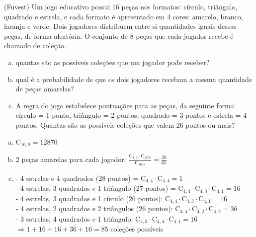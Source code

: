 \begin{ex}
  (Fuvest) Um jogo educativo possui 16 peças nos formatos: círculo, triângulo, quadrado e estrela, e cada formato é apresentado em 4 cores: amarelo, branco, laranja e verde. Dois jogadores distribuem entre si quantidades iguais dessas peças, de forma aleatória. O conjunto de 8 peças que cada jogador recebe é chamado de coleção.
      \begin{enumerate}  [(a)]
          \item quantas são as possíveis coleções que um jogador pode receber? 
          \item qual é a probabilidade de que os dois jogadores recebam a mesma quantidade de peças amarelas? 
          \item A regra do jogo estabelece pontuações para as peças, da seguinte forma: círculo = 1 ponto, triângulo = 2 pontos, quadrado = 3 pontos e estrela = 4 pontos. Quantas são as possíveis coleções que valem 26 pontos ou mais?
      \end{enumerate}
       \begin{sol}
        \phantom{A} 
         \begin{enumerate} [(a)]
             \item $\mathrm{C}_{{16},8}=12870$
             \item 2 peças amarelas para cada jogador: \hspace{0,4cm}
         $\frac{\mathrm{C}_{4,2}\cdot\mathrm{C}_{{12},6}}{\mathrm{C}_{{16},8}}=\frac{28}{65}$
         \item - 4 estrelas e 4 quadrados (28 pontos) = $\mathrm{C}_{4,4}\cdot\mathrm{C}_{4,4}=1$ \\
         - 4 estrelas, 3 quadrados e 1 triângulo (27 pontos) = $\mathrm{C}_{4,4}\cdot\mathrm{C}_{4,3}\cdot\mathrm{C}_{4,1}=16$ \\
         - 4 estrelas, 3 quadrados e 1 círculo (26 pontos): $\mathrm{C}_{4,4}\cdot\mathrm{C}_{4,3}\cdot\mathrm{C}_{4,1}=16$\\
         - 4 estrelas, 2 quadrados e 2 triângulos (26 pontos): $\mathrm{C}_{4,4}\cdot\mathrm{C}_{4,2}\cdot\mathrm{C}_{4,2}=36$ \\
         - 3 estrelas, 4 quadrados e 1 triângulo: $\mathrm{C}_{4,3}\cdot\mathrm{C}_{4,4}\cdot\mathrm{C}_{4,1}=16$ \\
         $\Longrightarrow 1+16+16+36+16=85$ coleções possíveis
         \end{enumerate}
       \end{sol}
 \end{ex}